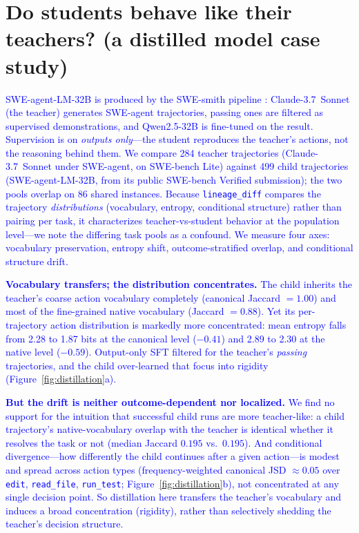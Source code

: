 \documentclass[12pt]{article}
\begin{document}
\section{Do students behave like their teachers? (a distilled model case study)}
\label{sec:distillation}
\textcolor{blue}{SWE-agent-LM-32B is produced by the SWE-smith pipeline \cite{yang2025swesmith}: Claude-3.7~Sonnet (the teacher) generates SWE-agent trajectories, passing ones are filtered as supervised demonstrations, and Qwen2.5-32B is fine-tuned on the result. Supervision is on \emph{outputs only}---the student reproduces the teacher's actions, not the reasoning behind them. We compare 284 teacher trajectories (Claude-3.7~Sonnet under SWE-agent, on SWE-bench Lite) against 499 child trajectories (SWE-agent-LM-32B, from its public SWE-bench Verified submission); the two pools overlap on 86 shared instances. Because \texttt{lineage\_diff} compares the trajectory \emph{distributions} (vocabulary, entropy, conditional structure) rather than pairing per task, it characterizes teacher-vs-student behavior at the population level---we note the differing task pools as a confound. We measure four axes: vocabulary preservation, entropy shift, outcome-stratified overlap, and conditional structure drift.}

\textcolor{blue}{\textbf{Vocabulary transfers; the distribution concentrates.} The child inherits the teacher's coarse action vocabulary completely (canonical Jaccard $=1.00$) and most of the fine-grained native vocabulary (Jaccard $=0.88$). Yet its per-trajectory action distribution is markedly more concentrated: mean entropy falls from 2.28 to 1.87 bits at the canonical level ($-0.41$) and 2.89 to 2.30 at the native level ($-0.59$). Output-only SFT filtered for the teacher's \emph{passing} trajectories, and the child over-learned that focus into rigidity (Figure~\ref{fig:distillation}a).}

\textcolor{blue}{\textbf{But the drift is neither outcome-dependent nor localized.} We find no support for the intuition that successful child runs are more teacher-like: a child trajectory's native-vocabulary overlap with the teacher is identical whether it resolves the task or not (median Jaccard $0.195$ vs.\ $0.195$). And conditional divergence---how differently the child continues after a given action---is modest and spread across action types (frequency-weighted canonical JSD $\approx 0.05$ over \texttt{edit}, \texttt{read\_file}, \texttt{run\_test}; Figure~\ref{fig:distillation}b), not concentrated at any single decision point. So distillation here transfers the teacher's vocabulary and induces a broad concentration (rigidity), rather than selectively shedding the teacher's decision structure.}
\end{document}
